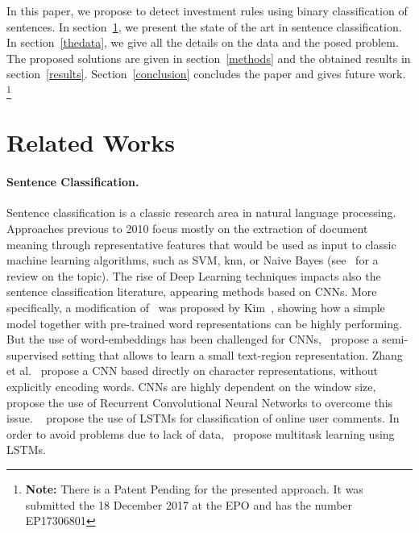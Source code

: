 \documentclass[11pt,a4paper]{article}
\begin{document}
In this paper, we propose to detect investment rules using binary classification of sentences. In section~\ref{star}, we present the state of the art in sentence classification. In section~\ref{thedata}, we give all the details on the data and the posed problem. The proposed solutions are given in section~\ref{methods} and the obtained results in section~\ref{results}. Section~\ref{conclusion} concludes the paper and gives future work.
\footnote{\textbf{Note:} There is a Patent Pending for the presented
approach. It was submitted the 18 December 2017 at the
EPO and has the number EP17306801}


\section{Related Works}\label{star}



\paragraph{Sentence Classification.} Sentence classification is a classic research area in natural language processing. Approaches previous to 2010 focus mostly on the extraction of document meaning through representative features that would be used as input to classic machine learning algorithms, such as SVM, knn, or Naive Bayes (see~\cite{khan2010review} for a review on the topic). The rise of Deep Learning techniques impacts also the sentence classification literature, appearing methods based on CNNs. More specifically, a modification of~\cite{collobert2011natural} was proposed by Kim~\cite{kim2014convolutional}, showing how a simple model together with pre-trained word representations can be highly performing. But the use of word-embeddings has been challenged for CNNs,~\cite{johnson2014effective,johnson2015semi}
propose a semi-supervised setting that allows to learn a small text-region representation.
Zhang et al.~\cite{zhang2015character} propose a CNN based directly on character representations, without explicitly encoding words. CNNs are highly dependent on the window size,~\cite{lai2015recurrent, visin2015renet} propose the use of Recurrent Convolutional Neural Networks to overcome this issue.  ~\cite{guggilla2016cnn} propose the use of LSTMs for classification of online user comments. In order to avoid problems due to lack of data,~\cite{liu2016recurrent} propose multitask learning using LSTMs.
\end{document}
